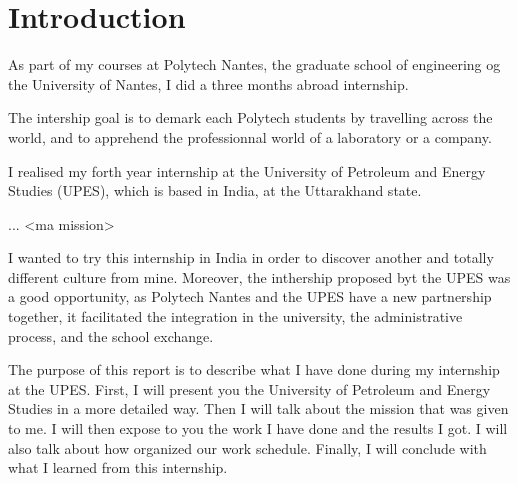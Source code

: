 \chapter{Introduction}

As part of my courses at Polytech Nantes, the graduate school of engineering og the University of Nantes, I did a three months abroad internship. 

The intership goal is to demark each Polytech students by travelling across the world, and to apprehend the professionnal world of a laboratory or a company.

I realised my forth year internship at the University of Petroleum and Energy Studies (UPES), which is based in India, at the Uttarakhand state.

... <ma mission>

I wanted to try this internship in India in order to discover another and totally different culture from mine. Moreover, the inthership proposed byt the UPES was a good opportunity, as Polytech Nantes and the UPES have a new partnership together, it facilitated the integration in the university, the administrative process, and the school exchange. 


The purpose of this report is to describe what I have done during my internship at the UPES. First, I will present you the University of Petroleum and Energy Studies in a more detailed way. Then I will talk about the mission that was given to me. I will then expose to you the work I have done and the results I got. I will also talk about how organized our work schedule. Finally, I will conclude with what I learned from this internship.
